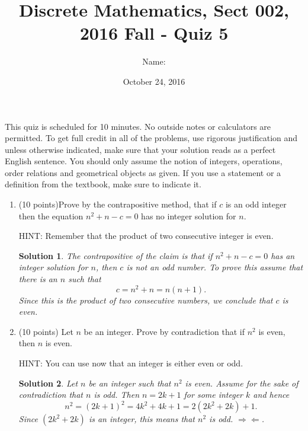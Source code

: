 \documentclass[11pt]{preprint}
\title{Discrete Mathematics, Sect 002, 2016 Fall - Quiz 5}
\date{October 24, 2016}
\author{Name:}
\institute{Courant Institute of Mathematical Sciences, NYU}
\newtheorem*{solution}{Solution}
\begin{document}
\maketitle

This quiz is scheduled for 10 minutes. No outside notes or calculators are permitted. To get full credit  in all of the problems, use rigorous justification and unless otherwise indicated, make sure that your solution reads as a perfect English sentence. You should only assume the notion of integers, operations, order relations and geometrical objects as given. If you use a statement or a definition from the textbook, make sure to indicate it.
\vspace{0.2cm}

\begin{enumerate}
\item(10 points)Prove by the contrapositive method, that if $c$ is an odd integer then the equation $n^2+n-c=0$ has no integer solution for $n$.

HINT: Remember that the product of two consecutive integer is even.

\begin{solution}
The contrapositive of the claim is that if $n^2+n-c=0$ has an integer solution for $n$, then $c$ is not an odd number. To prove this assume that there is an $n$ such that
\[
c=n^2+n=n(n+1).
\]
Since this is the product of two consecutive numbers, we conclude that $c$ is even.
\end{solution}




\item (10 points) Let $n$ be an integer. Prove by contradiction that if $n^2$ is even, then $n$ is even.

HINT: You can use now that an integer is either even or odd.

\begin{solution}
Let $n$ be an integer such that $n^2$ is even. Assume for the sake of contradiction that $n$ is odd. Then $n=2k+1$ for some integer $k$ and hence
\[
n^2=(2k+1)^2=4k^2+4k+1=2(2k^2+2k)+1.
\]
Since $(2k^2+2k)$ is an integer, this means that $n^2$ is odd. $\Rightarrow\Leftarrow$.
\end{solution}
\end{enumerate}
\end{document}
